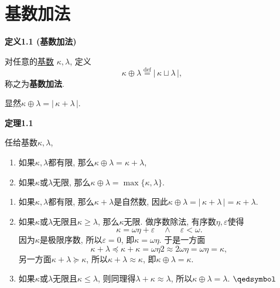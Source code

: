\documentclass[UTF8]{ctexart}
\begin{document}
\setlength{\abovedisplayskip}{1pt}
\setlength{\belowdisplayskip}{1pt}

\section{基数加法}

\hypertarget{sec:定义1.1}{}
\noindent\textbf{定义1.1 (基数加法)}

对任意的\href{../01 基数/01 基数#nameddest=sec:定义1.1}{基数}
$\kappa,\lambda$, 定义
\[
    \kappa\oplus\lambda\overset{\mathrm{def}}{=}|\,\kappa\sqcup\lambda\,|,
\]
称之为\textbf{基数加法}.


\vspace{10pt}

显然$\kappa\oplus\lambda=|\,\kappa+\lambda\,|$.

\vspace{10pt}

\hypertarget{sec:定理1.1}{}
\noindent\textbf{定理1.1}

任给基数$\kappa,\lambda$,
\begin{enumerate}
    \item 如果$\kappa,\lambda$都有限, 那么$\kappa\oplus\lambda=\kappa+\lambda$,
    \item 如果$\kappa$或$\lambda$无限,
    那么$\kappa\oplus\lambda=\max\{\kappa,\lambda\}$.
\end{enumerate}


\begin{enumerate}
    \item 如果$\kappa,\lambda$都有限, 那么$\kappa+\lambda$是自然数,
    因此$\kappa\oplus\lambda=|\,\kappa+\lambda\,|=\kappa+\lambda$.
    
    \item 如果$\kappa$或$\lambda$无限且$\kappa\geqslant\lambda$,
    那么$\kappa$无限. 做序数除法, 有序数$\eta,\varepsilon$使得
    \[
        \kappa=\omega\eta+\varepsilon\quad\land\quad\varepsilon<\omega.
    \]
    因为$\kappa$是极限序数, 所以$\varepsilon=0$, 即$\kappa=\omega\eta$. 于是一方面
    \[
        \kappa+\lambda\preccurlyeq\kappa+\kappa=\omega\eta2\approx
        2\omega\eta=\omega\eta=\kappa,
    \]
    另一方面$\kappa+\lambda\succcurlyeq\kappa$, 所以$\kappa+\lambda\approx\kappa$,
    即$\kappa\oplus\lambda=\kappa$.

    \item 如果$\kappa$或$\lambda$无限且$\kappa\leqslant\lambda$,
    则同理得$\lambda+\kappa\approx\lambda$, 所以$\kappa\oplus\lambda=\lambda$.
    \hfill $\qedsymbol$
\end{enumerate}
\end{document}

